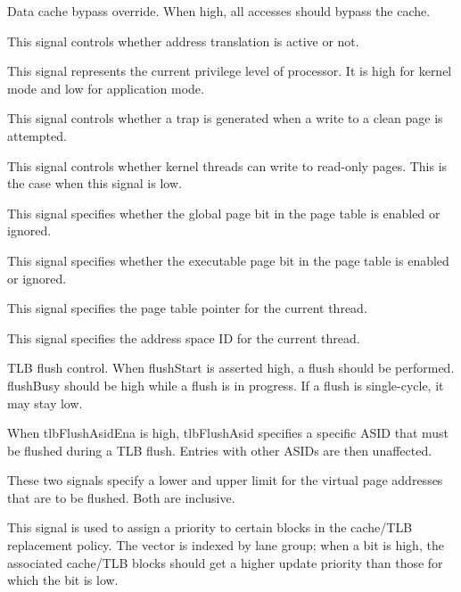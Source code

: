 \ifaceSubGroup{}
Data cache bypass override. When high, all accesses should bypass the cache.

\ifaceSubGroup{}
This signal controls whether address translation is active or not.

\ifaceSubGroup{}
This signal represents the current privilege level of processor. It is
high for kernel mode and low for application mode.

\ifaceSubGroup{}
This signal controls whether a trap is generated when a write to a clean
page is attempted.

\ifaceSubGroup{}
This signal controls whether kernel threads can write to read-only pages. This 
is the case when this signal is low.
    
\ifaceSubGroup{}
This signal specifies whether the global page bit in the page table is enabled 
or ignored.
    
\ifaceSubGroup{}
This signal specifies whether the executable page bit in the page table is 
enabled or ignored.

\ifaceSubGroup{}
This signal specifies the page table pointer for the current thread.

\ifaceSubGroup{}
This signal specifies the address space ID for the current thread.

\ifaceSubGroup{}
TLB flush control. When flushStart is asserted high, a flush should be 
performed. flushBusy should be high while a flush is in progress. If a flush is 
single-cycle, it may stay low.

\ifaceSubGroup{}
When tlbFlushAsidEna is high, tlbFlushAsid specifies a specific ASID that must 
be flushed during a TLB flush. Entries with other ASIDs are then unaffected.

\ifaceSubGroup{}
These two signals specify a lower and upper limit for the virtual page
addresses that are to be flushed. Both are inclusive.

\ifaceSubGroup{}
This signal is used to assign a priority to certain blocks in the cache/TLB
replacement policy. The vector is indexed by lane group; when a bit is high, the
associated cache/TLB blocks should get a higher update priority than those for
which the bit is low.

